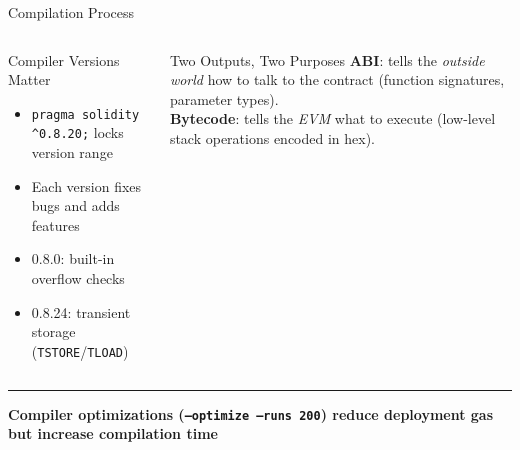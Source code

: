 \documentclass[8pt,aspectratio=169]{beamer}
\newcommand{\bottomnote}[1]{\vfill\vspace{-2mm}\textcolor{mllavender2}{\rule{\textwidth}{0.4pt}}\vspace{1mm}\footnotesize\textbf{#1}}
\begin{document}
\begin{frame}{Compilation Process}
\begin{center}
\end{center}
\vspace{2mm}
\begin{columns}
\begin{block}{Compiler Versions Matter}
\begin{itemize}\small
  \item \texttt{pragma solidity \^{}0.8.20;} locks version range
  \item Each version fixes bugs and adds features
  \item 0.8.0: built-in overflow checks
  \item 0.8.24: transient storage (\texttt{TSTORE}/\texttt{TLOAD})
\end{itemize}
\end{block}
\begin{alertblock}{Two Outputs, Two Purposes}
\small \textbf{ABI}: tells the \emph{outside world} how to talk to the contract (function signatures, parameter types).\\[2mm]
\textbf{Bytecode}: tells the \emph{EVM} what to execute (low-level stack operations encoded in hex).
\end{alertblock}
\end{columns}
\bottomnote{Compiler optimizations (\texttt{--optimize --runs 200}) reduce deployment gas but increase compilation time}
\end{frame}
\end{document}
